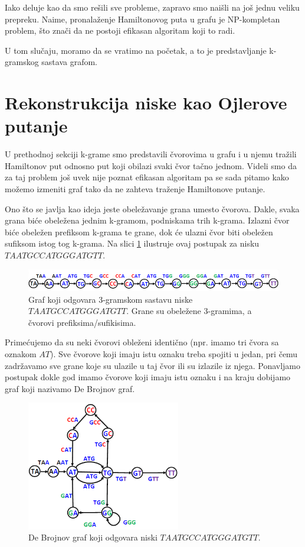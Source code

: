 Iako deluje kao da smo rešili sve probleme, zapravo smo naišli na još jednu veliku prepreku. Naime, pronalaženje Hamiltonovog puta u grafu je NP-kompletan problem, što znači da ne postoji efikasan algoritam koji to radi.

U tom slučaju, moramo da se vratimo na početak, a to je predstavljanje k-gramskog sastava grafom.


\section{Rekonstrukcija niske kao Ojlerove putanje}


U prethodnoj sekciji k-grame smo predstavili čvorovima u grafu i u njemu tražili Hamiltonov put odnosno put koji obilazi svaki čvor tačno jednom. Videli smo da za taj problem još uvek nije poznat efikasan algoritam pa se sada pitamo kako možemo izmeniti graf tako da ne zahteva traženje Hamiltonove putanje.

Ono što se javlja kao ideja jeste obeležavanje grana umesto čvorova. Dakle, svaka grana biće obeležena jednim k-gramom, podniskama trih k-grama. Izlazni čvor biće obeležen prefiksom k-grama te grane, dok će ulazni čvor biti obeležen sufiksom istog tog k-grama. Na slici \ref{slika:ojler} ilustruje ovaj postupak za nisku $TAATGCCATGGGATGTT$.

\begin{figure}[H]
	\centering
	\includegraphics[width=1\textwidth]{poglavlja/3/slike/ojler.png}
	\caption{Graf koji odgovara 3-gramskom sastavu niske $TAATGCCATGGGATGTT$. Grane su obeležene 3-gramima, a čvorovi prefiksima/sufikisima.}
	\label{slika:ojler}
\end{figure} 


Primećujemo da su neki čvorovi obleženi identično (npr. imamo tri čvora sa oznakom $AT$). Sve čvorove koji imaju istu oznaku treba spojiti u jedan, pri čemu zadržavamo sve grane koje su ulazile u taj čvor ili su izlazile iz njega. Ponavljamo postupak dokle god imamo čvorove koji imaju istu oznaku i na kraju dobijamo graf koji nazivamo De Brojnov graf. 

\begin{figure}[H]
	\centering
	\includegraphics[width=0.6\textwidth]{poglavlja/3/slike/debrojnov.png}
	\caption{De Brojnov graf koji odgovara niski $TAATGCCATGGGATGTT$.}
	\label{slika:debrojnov}
\end{figure} 

